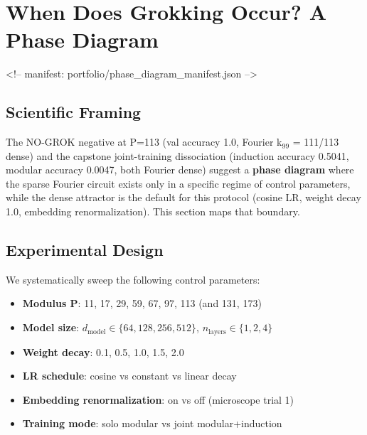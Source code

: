 %

\section{When Does Grokking Occur? A Phase Diagram}
\label{sec:grokking-phase-diagram}
<!-- manifest: portfolio/phase_diagram_manifest.json -->

\subsection{Scientific Framing}

The NO-GROK negative at P=113 (val accuracy 1.0, Fourier k$_{99}$ = 111/113 dense)
and the capstone joint-training dissociation (induction accuracy 0.5041, modular
accuracy 0.0047, both Fourier dense) suggest a \textbf{phase diagram} where the
sparse Fourier circuit exists only in a specific regime of control parameters,
while the dense attractor is the default for this protocol (cosine LR, weight
decay 1.0, embedding renormalization). This section maps that boundary.

\subsection{Experimental Design}

We systematically sweep the following control parameters:
\begin{itemize}
    \item \textbf{Modulus P}: 11, 17, 29, 59, 67, 97, 113 (and 131, 173)
    \item \textbf{Model size}: $d_{\text{model}} \in \{64, 128, 256, 512\}$, $n_{\text{layers}} \in \{1, 2, 4\}$
    \item \textbf{Weight decay}: 0.1, 0.5, 1.0, 1.5, 2.0
    \item \textbf{LR schedule}: cosine vs constant vs linear decay
    \item \textbf{Embedding renormalization}: on vs off (microscope trial 1)
    \item \textbf{Training mode}: solo modular vs joint modular+induction
\end{itemize}

